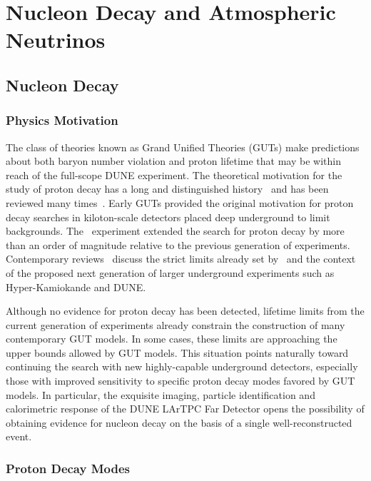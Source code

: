 \chapter{Nucleon Decay and Atmospheric Neutrinos}
\label{ch:physics-atmpdk}

\section{Nucleon Decay}
\label{sec:physics-atmpdk-ndk}

\subsection{Physics Motivation}
	The class of theories known as Grand Unified Theories (GUTs) make
predictions about both baryon number violation and proton lifetime that may be
within reach of the full-scope DUNE experiment. 
%
The theoretical motivation for the study of proton decay has a long and
distinguished history~\cite{Pati:1973rp,Georgi:1974sy,Dimopoulos:1981dw} and
has been reviewed many times~\cite{Langacker:1980js,deBoer:1994dg,Nath:2006ut}.
%
Early GUTs provided the original motivation for proton decay searches in
kiloton-scale detectors placed deep underground to limit backgrounds.  The
 \superk\ experiment extended the search for proton decay by more
than an order of magnitude relative to the previous generation of experiments.
%
Contemporary reviews~\cite{Raby:2008pd,Senjanovic:2009kr,Li:2010dp} discuss the
strict limits already set by \superk\ and the context of the proposed next
generation of larger underground
experiments such as Hyper-Kamiokande and DUNE.

Although no evidence for proton decay has been detected, lifetime
limits from the current generation of experiments already constrain
the construction of many contemporary GUT models. 
In some cases, these limits are approaching the upper bounds allowed 
by GUT models.  This situation points naturally toward continuing 
the search with new highly-capable underground detectors, especially those 
with improved sensitivity to specific proton decay modes favored by GUT models.
In particular, the exquisite imaging, particle identification and calorimetric 
response of the DUNE LArTPC Far Detector opens the possibility of obtaining 
evidence for nucleon decay on the basis of a single well-reconstructed event.

\subsection{Proton Decay Modes} 

